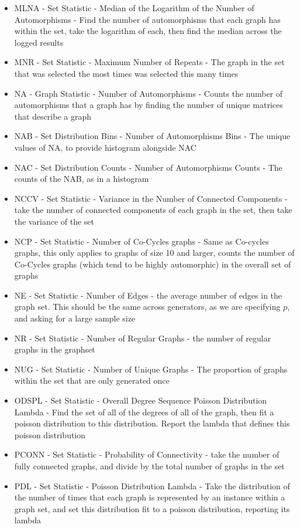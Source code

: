 \begin{itemize}
\item{MLNA - Set Statistic - Median of the Logarithm of the Number of Automorphisms - Find the number of automorphisms that each graph has within the set, take the logarithm of each, then find the median across the logged results}
\item{MNR - Set Statistic - Maximum Number of Repeats - The graph in the set that was selected the most times was selected this many times}
\item{NA - Graph Statistic - Number of Automorphisms - Counts the number of automorphisms that a graph has by finding the number of unique matrices that describe a graph}
\item{NAB - Set Distribution Bins - Number of Automorphisms Bins - The unique values of NA, to provide histogram alongside NAC}
\item{NAC - Set Distribution Counts - Number of Automorphisms Counts - The counts of the NAB, as in a histogram}
\item{NCCV - Set Statistic - Variance in the Number of Connected Components - take the number of connected components of each graph in the set, then take the variance of the set}
\item{NCP - Set Statistic - Number of Co-Cycles graphs - Same as Co-cycles graphs, this only applies to graphs of size 10 and larger, counts the number of Co-Cycles graphs (which tend to be highly automorphic) in the overall set of graphs}
\item{NE - Set Statistic - Number of Edges - the average number of edges in the graph set. This should be the same across generators, as we are specifying $p$, and asking for a large sample size}
\item{NR - Set Statistic - Number of Regular Graphs - the number of regular graphs in the graphset}
\item{NUG - Set Statistic - Number of Unique Graphs - The proportion of graphs within the set that are only generated once}
\item{ODSPL - Set Statistic - Overall Degree Sequence Poisson Distribution Lambda  - Find the set of all of the degrees of all of the graph, then fit a poisson distribution to this distribution. Report the lambda that defines this poisson distribution}
\item{PCONN - Set Statistic - Probability of Connectivity - take the number of fully connected graphs, and divide by the total number of graphs in the set}
\item{PDL - Set Statistic - Poisson Distribution Lambda - Take the distribution of the number of times that each graph is represented by an instance within a graph set, and set this distribution fit to a poisson distribution, reporting its lambda}

\end{itemize}
